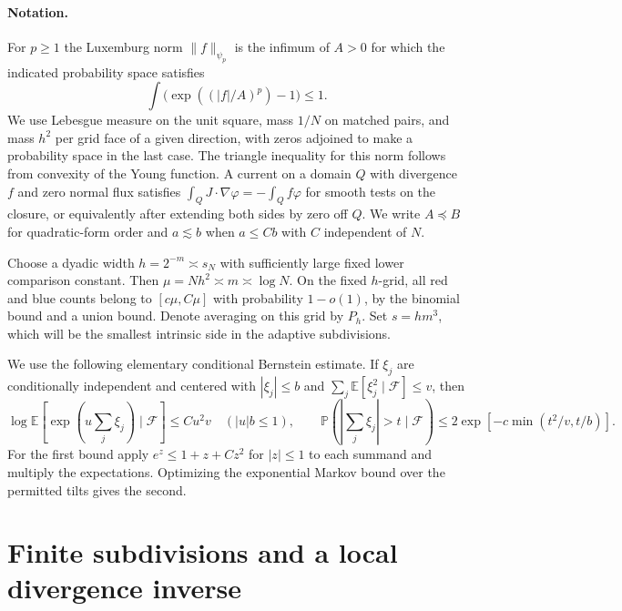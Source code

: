 \documentclass[11pt]{article}
\newcommand{\E}{\mathbb E}
\newcommand{\PP}{\mathbb P}
\begin{document}
\paragraph{Notation.}
For \(p\ge1\) the Luxemburg norm \(\|f\|_{\psi_p}\) is the
infimum of \(A>0\) for which the indicated probability space satisfies
\[
 \int\bigl(\exp((|f|/A)^p)-1\bigr)\le1.
\]
We use Lebesgue measure on the unit square, mass \(1/N\) on
matched pairs, and mass \(h^2\) per grid face of a given direction,
with zeros adjoined to make a probability space in the last case.
The triangle inequality for this norm follows from convexity of
the Young function. A current on a domain \(Q\) with divergence \(f\)
and zero normal flux satisfies
\(\int_Q J\cdot\nabla\varphi=-\int_Q f\varphi\)
for smooth tests on the closure, or equivalently after extending
both sides by zero off \(Q\).
We write \(A\preceq B\) for quadratic-form order and
\(a\lesssim b\) when \(a\le Cb\) with \(C\) independent of \(N\).

Choose a dyadic width \(h=2^{-m}\asymp s_N\) with sufficiently
large fixed lower comparison constant. Then
\(\mu=Nh^2\asymp m\asymp\log N\).
On the fixed \(h\)-grid, all red and blue counts belong to
\([c\mu,C\mu]\) with probability \(1-o(1)\), by the binomial
bound and a union bound. Denote averaging on this grid by \(P_h\).
Set \(s=h m^3\), which will be the smallest intrinsic side in
the adaptive subdivisions.

We use the following elementary conditional Bernstein estimate.
If \(\xi_j\) are conditionally independent and centered with
\(|\xi_j|\le b\) and \(\sum_j\E[\xi_j^2\mid\mathcal F]\le v\),
then
\[
 \log\E[\exp(u\textstyle\sum_j\xi_j)\mid\mathcal F]
 \le C u^2v\quad (|u|b\le1),
 \qquad
 \PP(|\textstyle\sum_j\xi_j|>t\mid\mathcal F)
 \le2\exp[-c\min(t^2/v,t/b)] .
\]
For the first bound apply \(e^z\le1+z+Cz^2\) for \(|z|\le1\)
to each summand and multiply the expectations. Optimizing the
exponential Markov bound over the permitted tilts gives the second.

\section{Finite subdivisions and a local divergence inverse}\label{sec:geometry}
\end{document}
